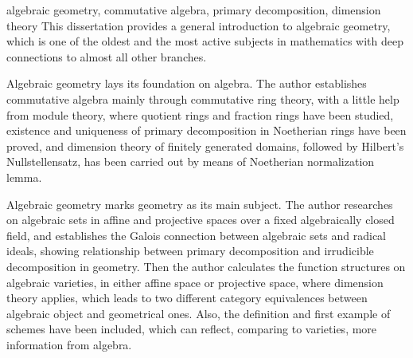 

\begin{abstract}{代数几何, 交换代数, 准素分解, 维数理论}
  代数几何历史悠久而又充满活力, 与其它数学分支有着深刻的联系, 是一门重要的学科. 代数几何的理论根基在于代数. 本文从基本定义开始建立了以环论为主模论为辅的交换代数理论, 研究了商环与分式环的基本性质, 证明了Noether环上准素分解的存在性及其满足的唯一性, 以域论为基础利用Noether正规化引理证明了域的有限生成整环上的维数定理和Hilbert零点定理.

  代数几何的研究对象在于几何. 本文研究了固定代数闭域上的仿射与射影空间中的代数集, 建立了根式理想与代数集之间的对应, 从而将准素分解理论与几何相联系. 本文还讨论了代数簇上的函数结构, 以此将维数理论应用到几何中, 并证明了两组代数范畴与几何范畴的等价. 最后本文简要介绍了概形的概念, 其相比于代数簇能更完整地体现代数所提供的信息.
\end{abstract}

\begin{abstract*}{algebraic geometry, commutative algebra, primary decomposition, dimension theory}
  This dissertation provides a general introduction to algebraic geometry, which is one of the oldest and the most active subjects in mathematics with deep connections to almost all other branches.

  Algebraic geometry lays its foundation on algebra. The author establishes commutative algebra mainly through commutative ring theory, with a little help from module theory, where quotient rings and fraction rings have been studied, existence and uniqueness of primary decomposition in Noetherian rings have been proved, and dimension theory of finitely generated domains, followed by Hilbert's Nullstellensatz, has been carried out by means of Noetherian normalization lemma.

  Algebraic geometry marks geometry as its main subject. The author researches on algebraic sets in affine and projective spaces over a fixed algebraically closed field, and establishes the Galois connection between algebraic sets and radical ideals, showing relationship between primary decomposition and irrudicible decomposition in geometry. Then the author calculates the function structures on algebraic varieties, in either affine space or projective space, where dimension theory applies, which leads to two different category equivalences between algebraic object and geometrical ones. Also, the definition and first example of schemes have been included, which can reflect, comparing to varieties, more information from algebra.
\end{abstract*}
